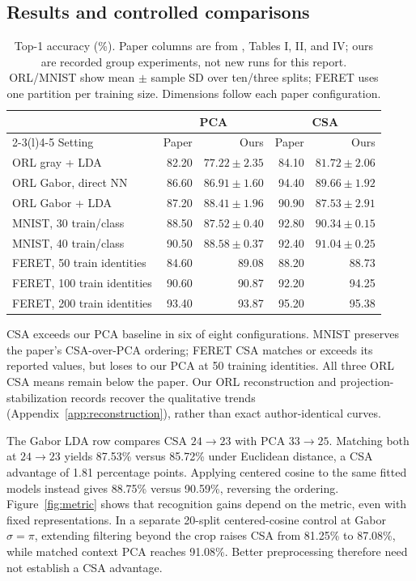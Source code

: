\subsection{Results and controlled comparisons}
\begin{table}[!ht]
\centering
\small
\setlength{\tabcolsep}{4pt}
\caption{Top-1 accuracy (\%). Paper columns are from \citet{xu2008csa},
Tables I, II, and IV; ours are recorded group experiments, not new runs for this
report. ORL/MNIST show mean $\pm$ sample SD over ten/three splits; FERET uses
one partition per training size. Dimensions follow each paper configuration.}
\label{tab:recognition}
\begin{tabular}{@{}lrrrr@{}}
\toprule
&\multicolumn{2}{c}{PCA}&\multicolumn{2}{c}{CSA}\\
\cmidrule(lr){2-3}\cmidrule(l){4-5}
Setting&Paper&Ours&Paper&Ours\\
\midrule
ORL gray + LDA&82.20&$77.22\pm2.35$&84.10&$81.72\pm2.06$\\
ORL Gabor, direct NN&86.60&$86.91\pm1.60$&94.40&$89.66\pm1.92$\\
ORL Gabor + LDA&87.20&$88.41\pm1.96$&90.90&$87.53\pm2.91$\\
MNIST, 30 train/class&88.50&$87.52\pm0.40$&92.80&$90.34\pm0.15$\\
MNIST, 40 train/class&90.50&$88.58\pm0.37$&92.40&$91.04\pm0.25$\\
FERET, 50 train identities&84.60&89.08&88.20&88.73\\
FERET, 100 train identities&90.60&90.87&92.20&94.25\\
FERET, 200 train identities&93.40&93.87&95.20&95.38\\
\bottomrule
\end{tabular}
\end{table}
\FloatBarrier

CSA exceeds our PCA baseline in six of eight configurations. MNIST preserves
the paper's CSA-over-PCA ordering; FERET CSA matches or exceeds its reported
values, but loses to our PCA at 50 training identities. All three ORL CSA means
remain below the paper. Our ORL reconstruction and projection-stabilization
records recover the qualitative trends (Appendix~\ref{app:reconstruction}),
rather than exact author-identical curves.

The Gabor LDA row compares CSA $24\to23$ with PCA $33\to25$.
Matching both at $24\to23$ yields 87.53\% versus 85.72\% under Euclidean distance,
a CSA advantage of 1.81 percentage points. Applying centered cosine to the same
fitted models instead gives 88.75\% versus 90.59\%, reversing the ordering.
Figure~\ref{fig:metric} shows that recognition gains depend on the metric, even
with fixed representations.
In a separate 20-split centered-cosine control at Gabor $\sigma=\pi$, extending filtering beyond
the crop raises CSA from 81.25\% to 87.08\%, while matched context PCA reaches
91.08\%. Better preprocessing therefore need not establish a CSA advantage.

